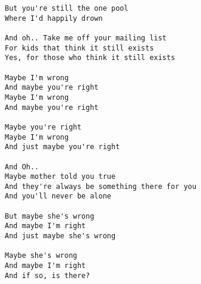 \documentclass[leqno]{memoir}
\begin{document}
\begin{verbatim}
But you're still the one pool
Where I'd happily drown

And oh.. Take me off your mailing list
For kids that think it still exists
Yes, for those who think it still exists

Maybe I'm wrong
And maybe you're right
Maybe I'm wrong
And maybe you're right

Maybe you're right
Maybe I'm wrong
And just maybe you're right

And Oh..
Maybe mother told you true
And they're always be something there for you
And you'll never be alone

But maybe she's wrong
And maybe I'm right
And just maybe she's wrong

Maybe she's wrong
And maybe I'm right
And if so, is there?
\end{verbatim}
\newpage
\end{document}
